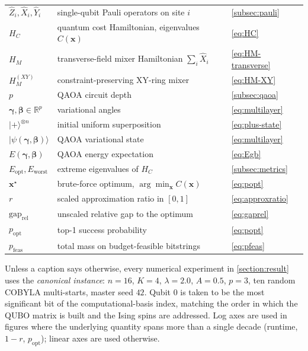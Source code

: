 \begin{table}[H]
\begin{tabular}{@{}lll@{}}
        $\hat Z_i, \hat X_i, \hat Y_i$ & single-qubit Pauli operators on site $i$               & \cref{subsec:pauli} \\
        $H_C$                     & quantum cost Hamiltonian, eigenvalues $C(\boldsymbol{x})$   & \eqref{eq:HC} \\
        $H_M$                     & transverse-field mixer Hamiltonian $\sum_i \hat X_i$        & \eqref{eq:HM-transverse} \\
        $H_M^{(XY)}$              & constraint-preserving XY-ring mixer                         & \eqref{eq:HM-XY} \\
        $p$                       & QAOA circuit depth                                          & \cref{subsec:qaoa} \\
        $\boldsymbol\gamma, \boldsymbol\beta \in \mathbb{R}^p$ & variational angles                  & \eqref{eq:multilayer} \\
        $|+\rangle^{\otimes n}$   & initial uniform superposition                               & \eqref{eq:plus-state} \\
        $|\psi(\boldsymbol\gamma,\boldsymbol\beta)\rangle$ & QAOA variational state                  & \eqref{eq:multilayer} \\
        $E(\boldsymbol\gamma,\boldsymbol\beta)$ & QAOA energy expectation                           & \eqref{eq:Egb} \\
        $E_{\text{opt}}, E_{\text{worst}}$ & extreme eigenvalues of $H_C$                         & \cref{subsec:metrics} \\
        $\boldsymbol{x}^\star$    & brute-force optimum, $\arg\min_{\boldsymbol{x}} C(\boldsymbol{x})$ & \eqref{eq:popt} \\
        $r$                       & scaled approximation ratio in $[0,1]$                       & \eqref{eq:approxratio} \\
        $\mathrm{gap}_{\text{rel}}$ & unscaled relative gap to the optimum                      & \eqref{eq:gaprel} \\
        $p_{\text{opt}}$          & top-1 success probability                                   & \eqref{eq:popt} \\
        $p_{\text{feas}}$         & total mass on budget-feasible bitstrings                    & \eqref{eq:pfeas} \\
        \bottomrule
    \end{tabular}
\end{table}

Unless a caption says otherwise, every numerical experiment in \cref{section:result} uses the \emph{canonical instance}: $n=16$, $K=4$, $\lambda=2.0$, $A=0.5$, $p=3$, ten random COBYLA multi-starts, master seed $42$. Qubit $0$ is taken to be the most significant bit of the computational-basis index, matching the order in which the QUBO matrix is built and the Ising spins are addressed. Log axes are used in figures where the underlying quantity spans more than a single decade (runtime, $1-r$, $p_{\text{opt}}$); linear axes are used otherwise.



